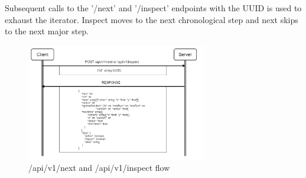 Subsequent calls to the '/next' and '/inspect' endpoints with the UUID is used to exhaust the iterator. Inspect moves to the next chronological step and next skips to the next major step.
\begin{figure}[H]
    \centering
    \includegraphics[width=0.7\textwidth]{images/stepped_solver_ui/next_inspect_stepped_flow.png}
    \caption{/api/v1/next and /api/v1/inspect flow}
    \label{fig:stepped_next_inspect_request}
\end{figure}

%